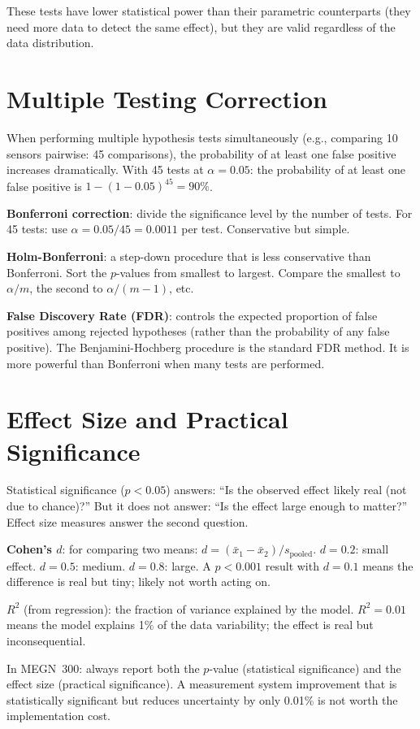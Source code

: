 \documentclass[11pt,letterpaper,twoside,openany]{book}
\begin{document}
These tests have lower statistical power than their parametric counterparts (they need more data to detect the same effect), but they are valid regardless of the data distribution.

\section{Multiple Testing Correction}
When performing multiple hypothesis tests simultaneously (e.g., comparing 10 sensors pairwise: 45 comparisons), the probability of at least one false positive increases dramatically. With 45 tests at $\alpha = 0.05$: the probability of at least one false positive is $1 - (1-0.05)^{45} = 90\%$.

\textbf{Bonferroni correction}: divide the significance level by the number of tests. For 45 tests: use $\alpha = 0.05/45 = 0.0011$ per test. Conservative but simple.

\textbf{Holm-Bonferroni}: a step-down procedure that is less conservative than Bonferroni. Sort the $p$-values from smallest to largest. Compare the smallest to $\alpha/m$, the second to $\alpha/(m-1)$, etc.

\textbf{False Discovery Rate (FDR)}: controls the expected proportion of false positives among rejected hypotheses (rather than the probability of any false positive). The Benjamini-Hochberg procedure is the standard FDR method. It is more powerful than Bonferroni when many tests are performed.

\section{Effect Size and Practical Significance}
Statistical significance ($p < 0.05$) answers: ``Is the observed effect likely real (not due to chance)?'' But it does not answer: ``Is the effect large enough to matter?'' Effect size measures answer the second question.

\textbf{Cohen's $d$}: for comparing two means: $d = (\bar{x}_1 - \bar{x}_2)/s_{\text{pooled}}$. $d = 0.2$: small effect. $d = 0.5$: medium. $d = 0.8$: large. A $p < 0.001$ result with $d = 0.1$ means the difference is real but tiny; likely not worth acting on.

\textbf{$R^2$} (from regression): the fraction of variance explained by the model. $R^2 = 0.01$ means the model explains 1\% of the data variability; the effect is real but inconsequential.

In MEGN~300: always report both the $p$-value (statistical significance) and the effect size (practical significance). A measurement system improvement that is statistically significant but reduces uncertainty by only 0.01\% is not worth the implementation cost.
\end{document}

